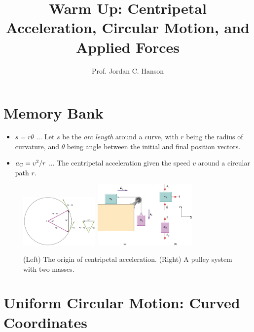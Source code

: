 \documentclass{article}
\begin{document}
\title{Warm Up: Centripetal Acceleration, Circular Motion, and Applied Forces}
\author{Prof. Jordan C. Hanson}

\maketitle

\section{Memory Bank}

\begin{itemize}
\item $s = r\theta$ ... Let $s$ be the \textit{arc length} around a curve, with $r$ being the radius of curvature, and $\theta$ being angle between the initial and final position vectors.
\item $a_{\rm C} = v^2/r$ ... The centripetal acceleration given the speed $v$ around a circular path $r$.
\end{itemize}

\begin{figure}
\centering
\includegraphics[width=0.345\textwidth]{figures/circle.png} \hspace{1cm}
\includegraphics[width=0.45\textwidth]{figures/blocks.jpg}
\caption{\label{fig:circle} (Left) The origin of centripetal acceleration.  (Right) A pulley system with two masses.}
\end{figure}

\section{Uniform Circular Motion: Curved Coordinates}
\end{document}
